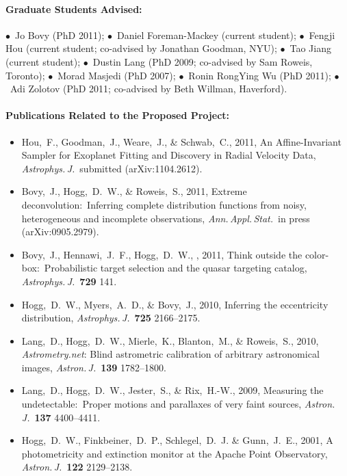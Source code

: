 \documentclass[letterpaper,12pt]{article}
\begin{document}
\paragraph{Graduate Students Advised:}
$\bullet$~Jo Bovy (PhD 2011);
$\bullet$~Daniel Foreman-Mackey (current student);
$\bullet$~Fengji Hou (current student; co-advised by Jonathan Goodman, NYU);
$\bullet$~Tao Jiang (current student);
$\bullet$~Dustin Lang (PhD 2009; co-advised by Sam Roweis, Toronto);
$\bullet$~Morad Masjedi (PhD 2007);
$\bullet$~Ronin RongYing Wu (PhD 2011);
$\bullet$~Adi Zolotov (PhD 2011; co-advised by Beth Willman, Haverford).

\paragraph{Publications Related to the Proposed Project:}
\begin{itemize}\setlength{\itemsep}{0pt}
\item
Hou,~F., Goodman,~J., Weare,~J., \& Schwab,~C., 2011, An
Affine-Invariant Sampler for Exoplanet Fitting and Discovery in Radial
Velocity Data, \textit{Astrophys.\,J.}\ submitted (arXiv:1104.2612).
\item
Bovy,~J., Hogg,~D.~W., \& Roweis,~S., 2011,
Extreme deconvolution:\ Inferring complete distribution functions
from noisy, heterogeneous and incomplete observations,
\textit{Ann.\,Appl.\,Stat.}\ in press (arXiv:0905.2979).
\item
Bovy,~J., Hennawi,~J.~F., Hogg,~D.~W., \etal, 2011,
Think outside the color-box:\ Probabilistic target selection and
the  quasar targeting catalog,
\textit{Astrophys.\,J.}\ \textbf{729} 141.
\item
Hogg,~D.~W., Myers,~A.~D., \& Bovy,~J., 2010, Inferring the
eccentricity distribution, \textit{Astrophys.\,J.}\ \textbf{725}
2166--2175.
\item
Lang,~D., Hogg,~D.~W., Mierle,~K., Blanton,~M., \& Roweis,~S., 2010,
\textsl{Astrometry.net}: Blind astrometric calibration of arbitrary
astronomical images,
\textit{Astron.\,J.}\ \textbf{139} 1782--1800.
\item
Lang,~D., Hogg,~D.~W., Jester,~S., \& Rix,~H.-W., 2009, Measuring the
undetectable:\ Proper motions and parallaxes of very faint sources,
\textit{Astron.\,J.}\ \textbf{137} 4400--4411.
\item
Hogg,~D.~W., Finkbeiner,~D.~P., Schlegel,~D.~J. \& Gunn,~J.~E., 2001, A
photometricity and extinction monitor at the Apache Point Observatory,
\textit{Astron.\,J.}\ \textbf{122} 2129--2138.
\end{itemize}
\end{document}
